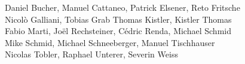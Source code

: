 %
%
%
Daniel Bucher, 			%
Manuel Cattaneo,		%
Patrick Elsener,		%
Reto Fritsche%
\\
Nicolò Galliani,		%
Tobias Grab%
Thomas Kistler,			%
Kistler Thomas%
\\
Fabio Marti,			%
Joël Rechsteiner,		%
Cédric Renda,			%
Michael Schmid%
\\
Mike Schmid,			%
Michael Schneeberger,		%
Manuel Tischhauser%
\\
Nicolas Tobler,			%
Raphael Unterer,		%
Severin Weiss%
